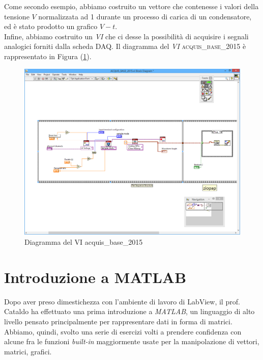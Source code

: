 \documentclass[journal, a4paper]{IEEEtran}
\begin{document}
	Come secondo esempio, abbiamo costruito un vettore che contenesse i valori della tensione $V$ normalizzata ad 1 durante un processo di carica di un condensatore, ed è stato prodotto un grafico $V-t$. \\
	
	Infine, abbiamo costruito un \textit{VI} che ci desse la possibilità di acquisire i segnali analogici forniti dalla scheda DAQ. Il diagramma del \textit{VI} \textsc{acquis\_base\_2015} è rappresentato in Figura (\ref{fig:acquisbase}).
	
	\begin{figure}
\centering
\includegraphics[width=0.9\linewidth]{./acquisbase}
\caption{Diagramma del VI acquis\_base\_2015}
\label{fig:acquisbase}
\end{figure}

	
	
	
	
\section{Introduzione a MATLAB}
	Dopo aver preso dimestichezza con l'ambiente di lavoro di LabView, il prof. Cataldo ha effettuato una prima introduzione a \textit{MATLAB}, un linguaggio di alto livello pensato principalmente per rappresentare dati in forma di matrici. Abbiamo, quindi, svolto una serie di esercizi volti a prendere confidenza con alcune fra le funzioni \textit{built-in} maggiormente usate per la manipolazione di vettori, matrici, grafici.
	


\end{document}
